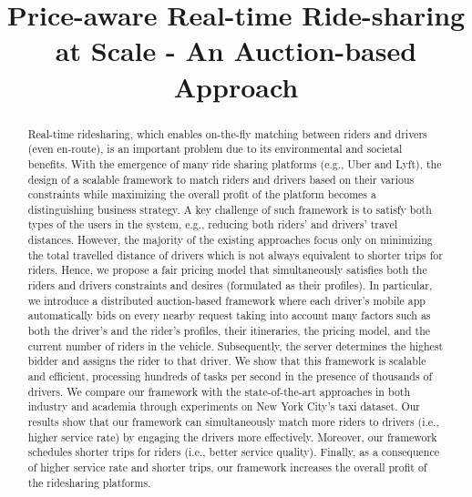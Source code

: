 \documentclass[]{sig-alternate-05-2015}
\title{Price-aware Real-time Ride-sharing at Scale - An Auction-based Approach}
\author{}
\begin{document}
\maketitle

\begin{abstract}
Real-time ridesharing, which enables on-the-fly matching between riders and drivers (even en-route), is an important problem due to its environmental and societal benefits. With the emergence of many ride sharing platforms (e.g., Uber and Lyft), the design of a scalable framework to match riders and drivers based on their various constraints while maximizing the overall profit of the platform becomes a distinguishing business strategy.
A key challenge of such framework is to satisfy both types of the users in the system, e.g., reducing both riders' and drivers' travel distances. However, the majority of the existing approaches focus only on minimizing the total travelled distance of drivers which is not always equivalent to shorter trips for riders. Hence, we propose a fair pricing model that simultaneously satisfies both the riders and drivers constraints and desires (formulated as their profiles). In particular, we introduce a distributed auction-based framework where each driver's mobile app automatically bids on every nearby request taking into account many factors such as both the driver's and the rider's profiles, their itineraries, the pricing model, and the current number of riders in the vehicle.  Subsequently, the server determines the highest bidder and assigns the rider to that driver. We show that this framework is scalable and efficient, processing hundreds of tasks per second in the presence of thousands of drivers. We compare our framework with the state-of-the-art approaches in both industry and academia through experiments on New York City's taxi dataset.  Our results show that our framework can simultaneously match more riders to drivers (i.e., higher service rate) by engaging the drivers more effectively. Moreover, our framework schedules shorter trips for riders (i.e., better service quality).   Finally, as a consequence of higher service rate and shorter trips, our framework increases the overall profit of the ridesharing platforms. 
\end{abstract}



%
%






\vspace{-0.1in}

\begin{scriptsize}


\end{scriptsize}
\end{document}
